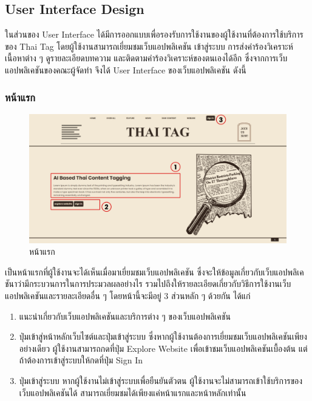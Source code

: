 \documentclass[12pt,oneside,openright,a4paper]{cpe-thai-project}
\begin{document}
      \subsection{User Interface Design}
        \hspace{1cm}ในส่วนของ User Interface ได้มีการออกแบบเพื่อรองรับการใช้งานของผู้ใช้งานที่ต้องการใช้บริการของ Thai Tag 
        โดยผู้ใช้งานสามารถเยี่ยมชมเว็บแอปพลิเคชัน เข้าสู่ระบบ การส่งคำร้องวิเคราะห์เนื้อหาต่าง ๆ  ดูรายละเอียดบทความ และติดตามคำร้องวิเคราะห์ของตนเองได้อีก
        ซึ่งจากการเว็บแอปพลิเคชันของคณะผู้จัดทำ จึงได้ User Interface ของเว็บแอปพลิเคชัน ดังนี้

        \subsubsection{หน้าแรก}
          \begin{figure}[!ht]\centering
            \includegraphics[width=\textwidth]{./img/project_ui/4_1.png}
            \caption{หน้าแรก}\label{fig:exp_landing}
          \end{figure}
          \hspace{1cm}เป็นหน้าแรกที่ผู้ใช้งานจะได้เห็นเมื่อมาเยี่ยมชมเว็บแอปพลิเคชัน ซึ่งจะให้ข้อมูลเกี่ยวกับเว็บแอปพลิเคชันาว่ามีกระบวนการในการประมวลผลอย่างไร 
          รวมไปถึงให้รายละเอียดเกี่ยวกับวิธีการใช้งานเว็บแอปพลิเคชันและรายละเอียดอื่น ๆ โดยหน้านี้จะมีอยู่ 3 ส่วนหลัก ๆ ด้วยกัน ได้แก่
          \begin{enumerate}
            \item แนะนำเกี่ยวกับเว็บแอปพลิเคชันและบริการต่าง ๆ ของเว็บแอปพลิเคชัน
            \item ปุ่มเข้าสู่หน้าหลักเว็บไซต์และปุ่มเข้าสู่ระบบ ซึ่งหากผู้ใช้งานต้องการเยี่ยมชมเว็บแอปพลิเคชันเพียงอย่างเดียว ผู้ใช้งานสามารถกดที่ปุ่ม Explore Website
                  เพื่อเข้าชมเว็บแอปพลิเคชันเบื้องต้น แต่ถ้าต้องการเข้าสู่ระบบให้กดที่ปุ่ม Sign In
            \item ปุ่มเข้าสู่ระบบ หากผู้ใช้งานไม่เข้าสู่ระบบเพื่อยืนยันตัวตน ผู้ใช้งานจะไม่สามารถเข้าใช้บริการของเว็บแอปพลิเคชันได้ 
                  สามารถเยี่ยมชมได้เพียงแค่หน้าแรกและหน้าหลักเท่านั้น
          \end{enumerate}
          \newpage
\end{document}

